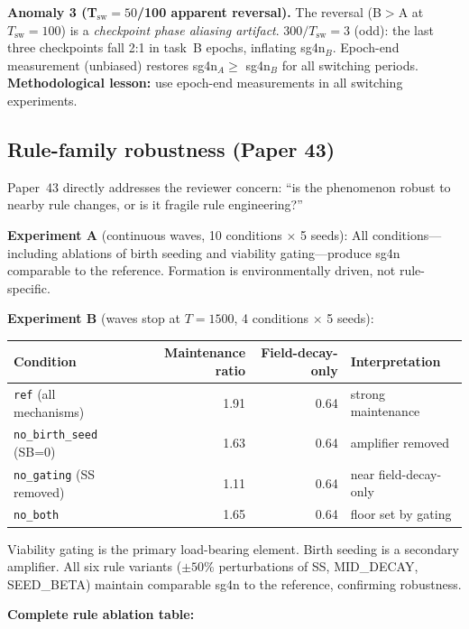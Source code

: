 \documentclass[11pt]{article}
\begin{document}
\textbf{Anomaly 3 (T$_\mathrm{sw}=50$/100 apparent reversal).}
The reversal (B$>$A at $T_\mathrm{sw}=100$) is a \emph{checkpoint phase aliasing artifact}.
$300/T_\mathrm{sw}=3$ (odd): the last three checkpoints fall 2:1 in task~B epochs,
inflating sg4n$_B$.
Epoch-end measurement (unbiased) restores sg4n$_A \geq$ sg4n$_B$ for all switching periods.
\textbf{Methodological lesson:} use epoch-end measurements in all switching experiments.

\subsection{Rule-family robustness (Paper 43)}

Paper~43 directly addresses the reviewer concern: ``is the phenomenon robust to nearby
rule changes, or is it fragile rule engineering?''

\textbf{Experiment A} (continuous waves, 10 conditions $\times$ 5 seeds):
All conditions---including ablations of birth seeding and viability gating---produce
sg4n comparable to the reference.
Formation is environmentally driven, not rule-specific.

\textbf{Experiment B} (waves stop at $T{=}1500$, 4 conditions $\times$ 5 seeds):

\begin{center}
\begin{tabular}{lrrl}
\toprule
\textbf{Condition} & \textbf{Maintenance ratio} & \textbf{Field-decay-only} & \textbf{Interpretation}\\
\midrule
\texttt{ref} (all mechanisms)    & 1.91 & 0.64 & strong maintenance\\
\texttt{no\_birth\_seed} (SB=0) & 1.63 & 0.64 & amplifier removed\\
\texttt{no\_gating} (SS removed) & 1.11 & 0.64 & near field-decay-only\\
\texttt{no\_both}                & 1.65 & 0.64 & floor set by gating\\
\bottomrule
\end{tabular}
\end{center}

Viability gating is the primary load-bearing element.
Birth seeding is a secondary amplifier.
All six rule variants ($\pm50\%$ perturbations of SS, MID\_DECAY, SEED\_BETA) maintain
comparable sg4n to the reference, confirming robustness.

\textbf{Complete rule ablation table:}
\end{document}
